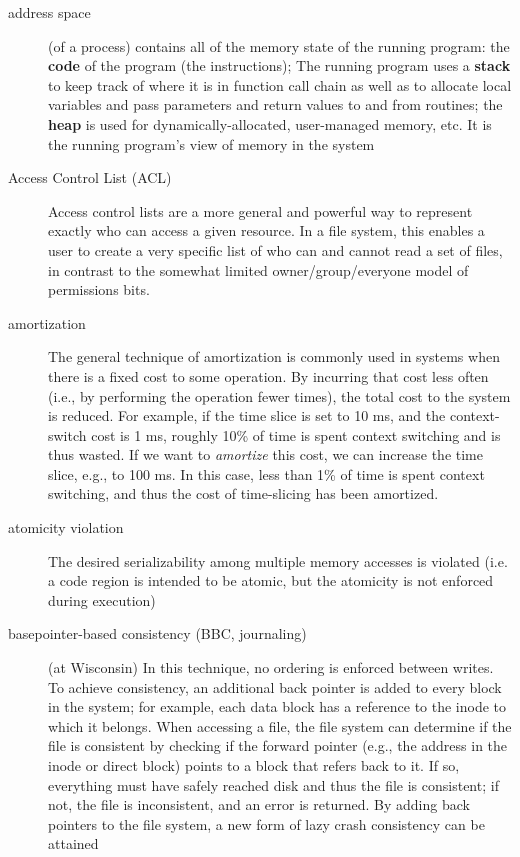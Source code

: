 \begin{description}
\item[address space] (of a process) contains all of the memory state of the
running program: the \textbf{code} of the program (the instructions); The running program uses a \textbf{stack} to keep track of where it is in function call chain as well as to allocate local variables and pass parameters and return values to and from routines; the \textbf{heap} is used for dynamically-allocated, user-managed memory, etc.  It is the running program’s view of memory in the system

\item[Access Control List (ACL)]  Access control lists are a more general and powerful way to represent exactly who can access a given resource. In a file system, this enables a user to create a very specific list of who can and cannot read a set of files, in contrast to the somewhat limited owner/group/everyone model of permissions bits.

\item[amortization] The general technique of amortization is commonly used in systems when there is a fixed cost to some operation. By incurring that cost less often (i.e., by performing the operation fewer times), the total cost to the system is reduced. For example, if the time slice is set to 10 ms, and the context-switch cost is 1 ms, roughly 10\% of time is spent context switching and is thus wasted. If we want to \emph{amortize} this cost, we can increase the time slice, e.g., to 100 ms. In this case, less than 1\% of time is spent context switching, and thus the cost of time-slicing has been amortized.

\item[atomicity violation] The desired serializability among multiple memory accesses is violated (i.e. a code region is intended to be atomic, but the atomicity is not enforced during execution)

\item[basepointer-based consistency (BBC, journaling)] (at Wisconsin) In this technique, no ordering is enforced between writes. To achieve consistency, an additional back pointer is added to every block in the system; for example, each data block has a reference to the inode to which it belongs. When accessing a file, the file system can determine if the file is consistent by checking if the forward pointer (e.g., the address in the inode or direct block) points to a block that refers back to it. If so, everything must have safely reached disk and thus the file is consistent; if not, the file is inconsistent, and an error is returned. By adding back pointers to the file system, a new form of lazy crash consistency can be attained


\end{description}
